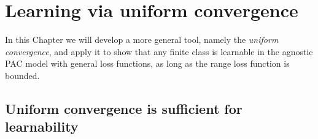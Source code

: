\documentclass[../../main/main.tex]{subfiles}
\begin{document}
\chapter{Learning via uniform convergence}

In this Chapter we will develop a more general tool, namely the \emph{uniform convergence}, and apply it to show that any finite class is learnable in the agnostic PAC model with general loss functions, as long as the range loss function is bounded.





\section{Uniform convergence is sufficient for learnability}
\end{document}
